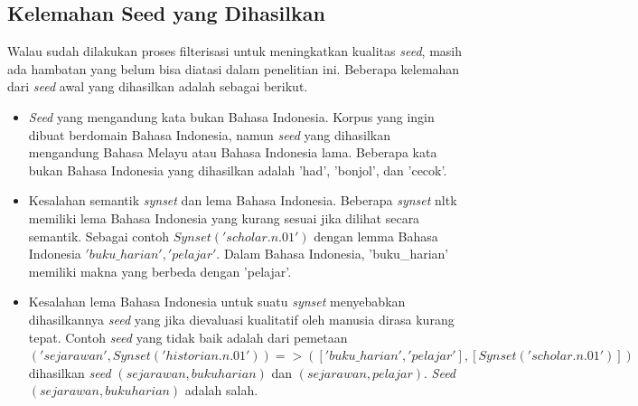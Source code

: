 \subsection{Kelemahan Seed yang Dihasilkan}
Walau sudah dilakukan proses filterisasi untuk meningkatkan kualitas \textit{seed}, masih ada hambatan yang belum bisa diatasi dalam penelitian ini. Beberapa kelemahan dari \textit{seed} awal yang dihasilkan adalah sebagai berikut.
\begin{itemize}
  \item \textit{Seed} yang mengandung kata bukan Bahasa Indonesia. Korpus yang ingin dibuat berdomain Bahasa Indonesia, namun \textit{seed} yang dihasilkan mengandung Bahasa Melayu atau Bahasa Indonesia lama. Beberapa kata bukan Bahasa Indonesia yang dihasilkan adalah 'had', 'bonjol', dan 'cecok'.
  \item Kesalahan semantik \textit{synset} dan lema Bahasa Indonesia. Beberapa \textit{synset} nltk memiliki lema Bahasa Indonesia yang kurang sesuai jika dilihat secara semantik. Sebagai contoh $Synset('scholar.n.01')$ dengan lemma Bahasa Indonesia ${'buku\_harian', 'pelajar'}$. Dalam Bahasa Indonesia, 'buku\_harian' memiliki makna yang berbeda dengan 'pelajar'.
  \item Kesalahan lema Bahasa Indonesia untuk suatu \textit{synset} menyebabkan dihasilkannya \textit{seed} yang jika dievaluasi kualitatif oleh manusia dirasa kurang tepat. Contoh \textit{seed} yang tidak baik adalah dari pemetaan $('sejarawan', Synset('historian.n.01')) => (['buku\_harian', 'pelajar'], [Synset('scholar.n.01')])$ dihasilkan \textit{seed} $(sejarawan,buku harian)$ dan $(sejarawan,pelajar)$. \textit{Seed} $(sejarawan,buku harian)$ adalah salah.
\end{itemize}


